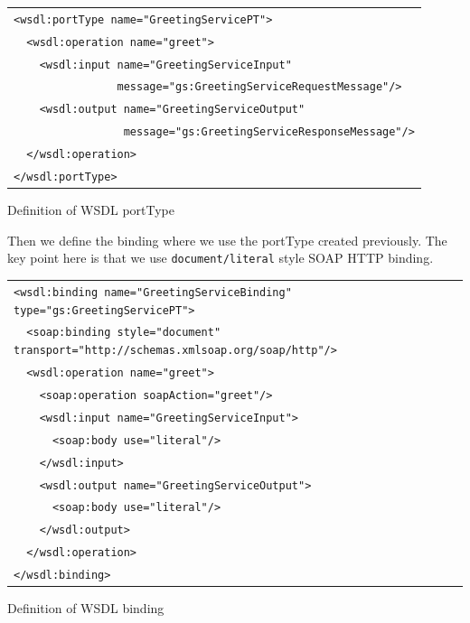 \documentclass{article}
\begin{document}
\begin{illustration}
\begin{center}
\begin{tabular}{|l|}
\hline
\verb#<wsdl:portType name="GreetingServicePT">#\\ 
\verb#  <wsdl:operation name="greet">#\\ 
\verb#    <wsdl:input name="GreetingServiceInput"#\\ 
\verb#                message="gs:GreetingServiceRequestMessage"/>#\\ 
\verb#    <wsdl:output name="GreetingServiceOutput"#\\ 
\verb#                 message="gs:GreetingServiceResponseMessage"/>#\\ 
\verb#  </wsdl:operation>#\\ 
\verb#</wsdl:portType>#\\ 
\hline
\end{tabular}
\end{center}
\caption{Definition of WSDL portType}
\end{illustration}

\pagebreak

Then we define the binding where we use the portType created previously. 
The key point here is that we use \texttt{document/literal}
style SOAP HTTP binding.

\begin{illustration}
\begin{center}
\begin{tabular}{|l|}
\hline
\verb#<wsdl:binding name="GreetingServiceBinding" type="gs:GreetingServicePT">#\\ 
\verb#  <soap:binding style="document" transport="http://schemas.xmlsoap.org/soap/http"/>#\\ 
\verb#  <wsdl:operation name="greet">#\\ 
\verb#    <soap:operation soapAction="greet"/>#\\ 
\verb#    <wsdl:input name="GreetingServiceInput">#\\ 
\verb#      <soap:body use="literal"/>#\\ 
\verb#    </wsdl:input>#\\ 
\verb#    <wsdl:output name="GreetingServiceOutput">#\\ 
\verb#      <soap:body use="literal"/>#\\
\verb#    </wsdl:output>#\\ 
\verb#  </wsdl:operation>#\\ 
\verb#</wsdl:binding>#\\
\hline
\end{tabular}
\end{center}
\caption{Definition of WSDL binding}
\end{illustration}
\end{document}
